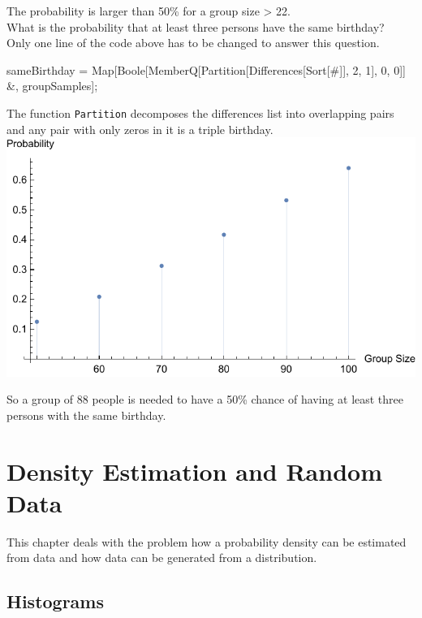 \documentclass{tstextbook}
\begin{document}
\begin{example}
 The probability is larger than 50\%  for a group size > 22.\\

What is the probability that at least three persons have the same birthday?\\

Only one line of the code above has to be changed to answer this question. 
\begin{mathematica}
sameBirthday = 
    Map[Boole[MemberQ[Partition[Differences[Sort[#]], 2, 1], {0, 0}]] &,
    groupSamples];
\end{mathematica}

The function \texttt{Partition} decomposes the differences list into overlapping pairs and any pair with only zeros in it is a triple birthday.\\   

\includegraphics{images/triple_birthday_problem.pdf}

So a group of 88 people is needed to have a 50\% chance of having at least three persons with the same birthday.
\end{example}

\chapter{Density Estimation and Random Data}

\begin{summary}
  This chapter deals with the problem how a probability density can be estimated from data and how data can be generated from a distribution.
\end{summary}

\section{Histograms}
\label{Histograms}
\end{document}
